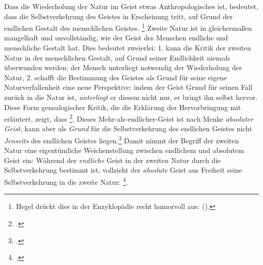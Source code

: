 \documentclass[12pt, a4paper, openany]{report}
\begin{document}
Dass die Wiederholung der Natur im Geist etwas Anthropologisches ist, bedeutet, dass die Selbstverkehrung des Geistes in Erscheinung tritt, auf Grund der endlichen Gestalt des menschlichen Geistes.%
\footnote{
    Hegel drückt dies in der Enzyklopädie recht humorvoll aus:  (\cite[][§ 410 A, S. 186]{hegel_enzyklopädie_1969}).
}
Zweite Natur ist in gleichermaßen mangelhaft und unvollständig, wie der Geist des Menschen endliche und menschliche Gestalt hat.
Dies bedeutet zweierlei: 
1. kann die Kritik der zweiten Natur in der menschlichen Gestalt, auf Grund seiner Endlichkeit niemals überwunden werden;
der Mensch unterliegt notwendig der Wiederholung der Natur,
2. schafft die Bestimmung des Geistes als Grund für seine eigene Naturverfallenheit eine neue Perspektive: 
indem der Geist Grund für seinen Fall zurück in die Natur ist, \emph{unterliegt} er diesem nicht nur, er bringt ihn selbst hervor.
Diese Form genealogischer Kritik, die die Erklärung der Hervorbringung mit erläutert, zeigt, dass \footcite[][140]{menke_autonomie_2018}.
Dieses Mehr-als-endlicher-Geist ist nach Menke \emph{absoluter Geist}, kann aber als \emph{Grund} für die Selbstverkehrung des endlichen Geistes nicht \emph{Jenseits} des endlichen Geistes liegen.\footcite[Vgl.][140]{menke_autonomie_2018}
Damit nimmt der Begriff der zweiten Natur eine eigentümliche Weichenstellung zwischen endlichem und absolutem Geist ein:
Während der \emph{endliche} Geist in der zweiten Natur durch die Selbstverkehrung bestimmt ist, vollzieht der \emph{absolute} Geist aus Freiheit seine Selbstverkehrung in die zweite Natur:
\footcite[Vgl.][140]{menke_autonomie_2018}.
\end{document}
